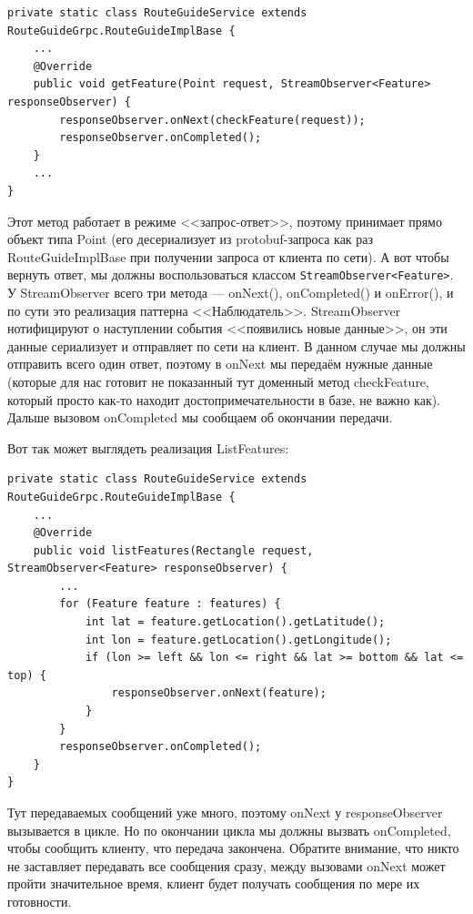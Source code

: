 \documentclass[a5paper]{article}
\begin{document}
\begin{verbatim}
private static class RouteGuideService extends RouteGuideGrpc.RouteGuideImplBase {
    ...
    @Override
    public void getFeature(Point request, StreamObserver<Feature> responseObserver) {
        responseObserver.onNext(checkFeature(request));
        responseObserver.onCompleted();
    }
    ...
}
\end{verbatim}

Этот метод работает в режиме <<запрос-ответ>>, поэтому принимает прямо объект типа Point (его десериализует из protobuf-запроса как раз RouteGuideImplBase при получении запроса от клиента по сети). А вот чтобы вернуть ответ, мы должны воспользоваться классом \texttt{StreamObserver<Feature>}. У StreamObserver всего три метода --- onNext(), onCompleted() и onError(), и по сути это реализация паттерна <<Наблюдатель>>. StreamObserver нотифицируют о наступлении события <<появились новые данные>>, он эти данные сериализует и отправляет по сети на клиент. В данном случае мы должны отправить всего один ответ, поэтому в onNext мы передаём нужные данные (которые для нас готовит не показанный тут доменный метод checkFeature, который просто как-то находит достопримечательности в базе, не важно как). Дальше вызовом onCompleted мы сообщаем об окончании передачи.

Вот так может выглядеть реализация ListFeatures:

\begin{verbatim}
private static class RouteGuideService extends RouteGuideGrpc.RouteGuideImplBase {
    ...
    @Override
    public void listFeatures(Rectangle request, StreamObserver<Feature> responseObserver) {
        ...
        for (Feature feature : features) {
            int lat = feature.getLocation().getLatitude();
            int lon = feature.getLocation().getLongitude();
            if (lon >= left && lon <= right && lat >= bottom && lat <= top) {
                responseObserver.onNext(feature);
            }
        }
        responseObserver.onCompleted();
    }
}
\end{verbatim}

Тут передаваемых сообщений уже много, поэтому onNext у responseObserver вызывается в цикле. Но по окончании цикла мы должны вызвать onCompleted, чтобы сообщить клиенту, что передача закончена. Обратите внимание, что никто не заставляет передавать все сообщения сразу, между вызовами onNext может пройти значительное время, клиент будет получать сообщения по мере их готовности.
\end{document}
